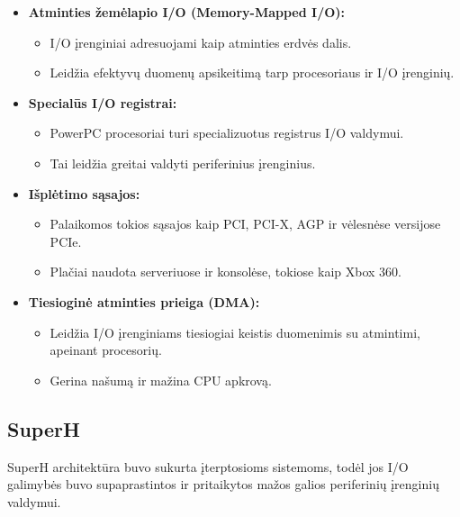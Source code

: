 \documentclass{article}
\begin{document}
\begin{itemize}
    \item \textbf{Atminties žemėlapio I/O (Memory-Mapped I/O):}
        \begin{itemize}
            \item I/O įrenginiai adresuojami kaip atminties erdvės dalis.
            \item Leidžia efektyvų duomenų apsikeitimą tarp procesoriaus ir I/O įrenginių.
        \end{itemize}
    \item \textbf{Specialūs I/O registrai:}
        \begin{itemize}
            \item PowerPC procesoriai turi specializuotus registrus I/O valdymui.
            \item Tai leidžia greitai valdyti periferinius įrenginius.
        \end{itemize}
    \item \textbf{Išplėtimo sąsajos:}
        \begin{itemize}
            \item Palaikomos tokios sąsajos kaip PCI, PCI-X, AGP ir vėlesnėse versijose PCIe.
            \item Plačiai naudota serveriuose ir konsolėse, tokiose kaip Xbox 360.
        \end{itemize}
    \item \textbf{Tiesioginė atminties prieiga (DMA):}
        \begin{itemize}
            \item Leidžia I/O įrenginiams tiesiogiai keistis duomenimis su atmintimi, apeinant procesorių.
            \item Gerina našumą ir mažina CPU apkrovą.
        \end{itemize}
\end{itemize}

\subsection{SuperH}
SuperH architektūra buvo sukurta įterptosioms sistemoms, todėl jos I/O galimybės buvo supaprastintos ir pritaikytos mažos galios periferinių įrenginių valdymui.
\end{document}
